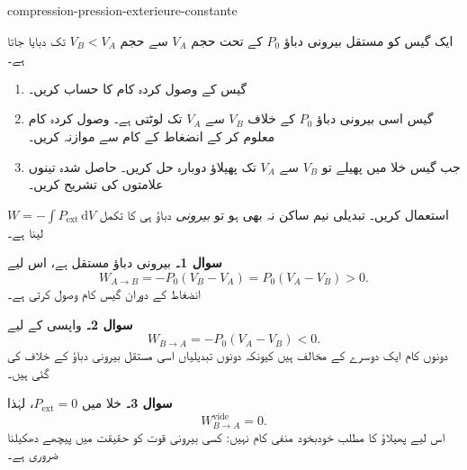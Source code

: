 \begin{exo}{compression-pression-exterieure-constante}

ایک گیس کو مستقل بیرونی دباؤ $P_0$ کے تحت حجم $V_A$ سے حجم $V_B<V_A$ تک دبایا جاتا ہے۔

\begin{enumerate}
\item گیس کے وصول کردہ کام کا حساب کریں۔
\item گیس اسی بیرونی دباؤ $P_0$ کے خلاف $V_B$ سے $V_A$ تک لوٹتی ہے۔ وصول کردہ کام معلوم کر کے انضغاط کے کام سے موازنہ کریں۔
\item جب گیس خلا میں پھیلے تو $V_B$ سے $V_A$ تک پھیلاؤ دوبارہ حل کریں۔ حاصل شدہ تینوں علامتوں کی تشریح کریں۔
\end{enumerate}

\begin{indication}
$W=-\int P_{\mathrm{ext}}\,\mathrm{d}V$ استعمال کریں۔ تبدیلی نیم ساکن نہ بھی ہو
تو \emph{بیرونی} دباؤ ہی کا تکمل لینا ہے۔
\end{indication}

\begin{solution}
\textbf{سوال 1۔} بیرونی دباؤ مستقل ہے، اس لیے
\[
W_{A\to B}=-P_0(V_B-V_A)=P_0(V_A-V_B)>0.
\]
انضغاط کے دوران گیس کام وصول کرتی ہے۔

\textbf{سوال 2۔} واپسی کے لیے
\[
W_{B\to A}=-P_0(V_A-V_B)<0.
\]
دونوں کام ایک دوسرے کے مخالف ہیں کیونکہ دونوں تبدیلیاں اسی مستقل بیرونی دباؤ کے خلاف کی گئی ہیں۔

\textbf{سوال 3۔} خلا میں $P_{\mathrm{ext}}=0$، لہٰذا
\[
W_{B\to A}^{\mathrm{vide}}=0.
\]
اس لیے پھیلاؤ کا مطلب خودبخود منفی کام نہیں: کسی بیرونی قوت کو حقیقت میں پیچھے دھکیلنا ضروری ہے۔
\end{solution}
\end{exo}
